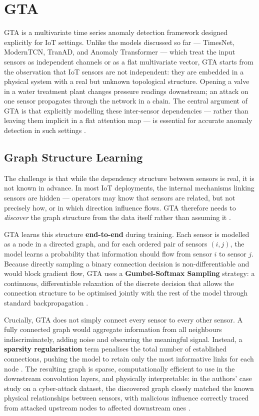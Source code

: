 \documentclass[twoside,11pt,openright]{report}
\begin{document}
\section{GTA}

GTA \citep{gta2022} is a multivariate time series anomaly detection framework
designed explicitly for IoT settings. Unlike the models discussed so far ---
TimesNet, ModernTCN, TranAD, and Anomaly Transformer --- which treat the
input sensors as independent channels or as a flat multivariate vector, GTA
starts from the observation that IoT sensors are not independent: they are
embedded in a physical system with a real but unknown topological structure.
Opening a valve in a water treatment plant changes pressure readings downstream;
an attack on one sensor propagates through the network in a chain. The central
argument of GTA is that explicitly modelling these inter-sensor dependencies
--- rather than leaving them implicit in a flat attention map --- is essential
for accurate anomaly detection in such settings \citep{gta2022}.

\subsection{Graph Structure Learning}

The challenge is that while the dependency structure between sensors is real,
it is not known in advance. In most IoT deployments, the internal mechanisms
linking sensors are hidden --- operators may know that sensors are related, but
not precisely how, or in which direction influence flows. GTA therefore needs
to \textit{discover} the graph structure from the data itself rather than
assuming it \citep{gta2022}.

GTA learns this structure \textbf{end-to-end} during training. Each sensor is
modelled as a node in a directed graph, and for each ordered pair of sensors
$(i, j)$, the model learns a probability that information should flow from
sensor $i$ to sensor $j$. Because directly sampling a binary connection
decision is non-differentiable and would block gradient flow, GTA uses a
\textbf{Gumbel-Softmax Sampling} strategy: a continuous, differentiable
relaxation of the discrete decision that allows the connection structure to be
optimised jointly with the rest of the model through standard backpropagation
\citep{gta2022}.

Crucially, GTA does not simply connect every sensor to every other sensor. A
fully connected graph would aggregate information from all neighbours
indiscriminately, adding noise and obscuring the meaningful signal. Instead, a
\textbf{sparsity regularisation} term penalises the total number of established
connections, pushing the model to retain only the most informative links for
each node \citep{gta2022}. The resulting graph is sparse, computationally
efficient to use in the downstream convolution layers, and physically
interpretable: in the authors' case study on a cyber-attack dataset, the
discovered graph closely matched the known physical relationships between
sensors, with malicious influence correctly traced from attacked upstream nodes
to affected downstream ones \citep{gta2022}.
\end{document}
